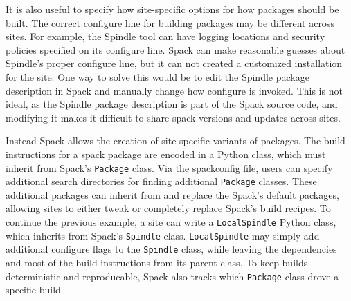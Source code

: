 It is also useful to specify how site-specific options for how packages should be built.  The correct configure line for building packages may be different across sites.  For example, the Spindle tool can have logging locations and security policies specified on its configure line.  Spack can make reasonable guesses about Spindle's proper configure line, but it can not created a customized installation for the site.  One way to solve this would be to edit the Spindle package description in Spack and manually change how configure is invoked.  This is not ideal, as the Spindle package description is part of the Spack source code, and modifying it makes it difficult to share spack versions and updates across sites.

Instead Spack allows the creation of site-specific variants of packages.  The build instructions for a spack package are encoded in a Python class, which must inherit from Spack's {\tt Package} class.  Via the spackconfig file, users can specify additional search directories for finding additional {\tt Package} classes.  These additional packages can inherit from and replace the Spack's default packages, allowing sites to either tweak or completely replace Spack's build recipes.  To continue the previous example, a site can write a {\tt LocalSpindle} Python class, which inherits from Spack's {\tt Spindle} class.  {\tt LocalSpindle} may simply add additional configure flags to the {\tt Spindle} class, while leaving the dependencies and most of the build instructions from its parent class.  To keep builds deterministic and reproducable, Spack also tracks which {\tt Package} class drove a specific build. 

